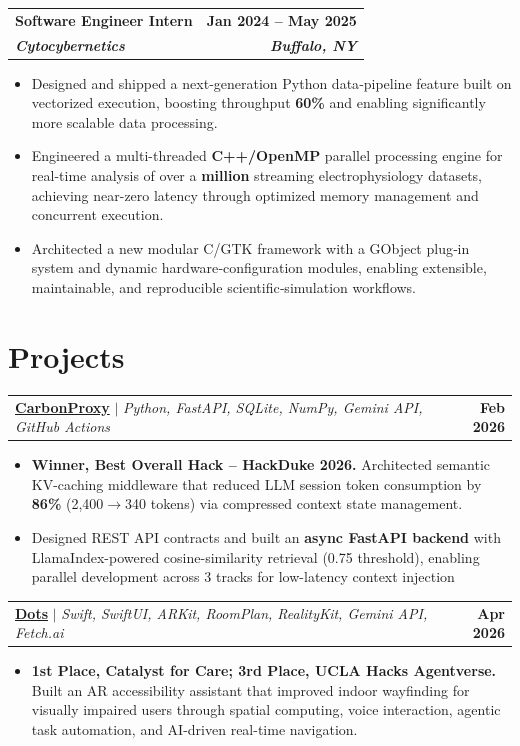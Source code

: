 \documentclass[letterpaper,10.5pt]{article}
\makeatletter
\newcommand{\roleheading}[4]{%
  \vspace{2pt}%
  \begin{tabular*}{\textwidth}[t]{l@{\extracolsep{\fill}}r}
    \textbf{#1} & \textbf{\small #2} \\
    \textbf{\textit{\small #3}} & \textbf{\textit{\small #4}} \\
  \end{tabular*}%
}
\newcommand{\projheading}[2]{%
  \vspace{2pt}%
  \begin{tabular*}{\textwidth}[t]{l@{\extracolsep{\fill}}r}
    \small #1 & \textbf{\small #2} \\
  \end{tabular*}%
}
\newcommand{\bul}[1]{%
  \item \small{#1}\vspace{-1pt}%
}
\newcommand{\bullist}{\begin{itemize}[leftmargin=12pt, label={\tiny$\bullet$}, topsep=1pt, itemsep=0pt, parsep=0pt]}
\newcommand{\stopbulls}{\end{itemize}\vspace{-2.75pt}}
\makeatother
\begin{document}
\roleheading{Software Engineer Intern}{Jan 2024 -- May 2025}{Cytocybernetics}{Buffalo, NY}
\bullist
  \bul{Designed and shipped a next‑generation Python data‑pipeline feature built on vectorized execution, boosting throughput \textbf{60\%} and enabling significantly more scalable data processing.}
  \bul{Engineered a multi-threaded \textbf{C++/OpenMP} parallel processing engine for real-time analysis of over a \textbf{million} streaming electrophysiology datasets, achieving near-zero latency through optimized memory management and concurrent execution.}
  \bul{Architected a new modular C/GTK framework with a GObject plug‑in system and dynamic hardware‑configuration modules, enabling extensible, maintainable, and reproducible scientific‑simulation workflows.}
\stopbulls

\vspace{-7pt}
\section{Projects}
\vspace{-2pt}

\projheading{\textbf{\href{https://devpost.com/software/carbonproxy}{CarbonProxy}} $|$ \emph{Python, FastAPI, SQLite, NumPy, Gemini API, GitHub Actions}}{Feb 2026}
\bullist
  \bul{\textbf{Winner, Best Overall Hack -- HackDuke 2026.} Architected semantic KV-caching middleware that reduced LLM session token consumption by \textbf{86\%} (2,400$\to$340 tokens) via compressed context state management.}
  \bul{Designed REST API contracts and built an \textbf{async FastAPI backend} with LlamaIndex-powered cosine-similarity retrieval (0.75 threshold), enabling parallel development across 3 tracks for low-latency context injection}
\stopbulls
\vspace{3pt}

\projheading{\textbf{\href{https://devpost.com/software/dots-y5r21j}{Dots}} $|$ \emph{Swift, SwiftUI, ARKit, RoomPlan, RealityKit, Gemini API, Fetch.ai}}{Apr 2026}
\bullist
  \bul{\textbf{1st Place, Catalyst for Care; 3rd Place, UCLA Hacks Agentverse.} Built an AR accessibility assistant that improved indoor wayfinding for visually impaired users through spatial computing, voice interaction, agentic task automation, and AI-driven real-time navigation.}
\stopbulls
\vspace{3pt}

\end{document}
